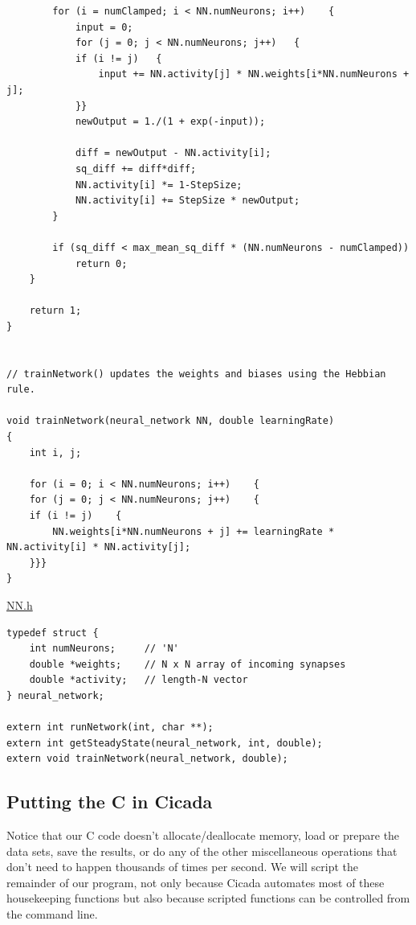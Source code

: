 \documentclass{article}
\newenvironment{longcode}{
       \begin{list}{}{
               \setlength{\leftmargin}{0in}
               \setlength{\rightmargin}{0in}
               \setlength{\topsep}{.2in}
       }
       \small
       \item[] }
       { \end{list}   }
\begin{document}
\begin{longcode}
\begin{verbatim}
        for (i = numClamped; i < NN.numNeurons; i++)	{
            input = 0;
            for (j = 0; j < NN.numNeurons; j++)   {
            if (i != j)   {
                input += NN.activity[j] * NN.weights[i*NN.numNeurons + j];
            }}
            newOutput = 1./(1 + exp(-input));
            
            diff = newOutput - NN.activity[i];
            sq_diff += diff*diff;
            NN.activity[i] *= 1-StepSize;
            NN.activity[i] += StepSize * newOutput;
        }
        
        if (sq_diff < max_mean_sq_diff * (NN.numNeurons - numClamped))
            return 0;
    }
    
    return 1;
}


// trainNetwork() updates the weights and biases using the Hebbian rule.

void trainNetwork(neural_network NN, double learningRate)
{
    int i, j;
    
    for (i = 0; i < NN.numNeurons; i++)    {
    for (j = 0; j < NN.numNeurons; j++)    {
    if (i != j)    {
        NN.weights[i*NN.numNeurons + j] += learningRate * NN.activity[i] * NN.activity[j];
    }}}
}
\end{verbatim} \end{longcode}

\noindent \underline{NN.h}

\begin{longcode} \begin{verbatim}
typedef struct {
    int numNeurons;     // 'N'
    double *weights;    // N x N array of incoming synapses
    double *activity;   // length-N vector
} neural_network;

extern int runNetwork(int, char **);
extern int getSteadyState(neural_network, int, double);
extern void trainNetwork(neural_network, double);
\end{verbatim} \end{longcode}




\subsection{Putting the C in Cicada}

Notice that our C code doesn't allocate/deallocate memory, load or prepare the data sets, save the results, or do any of the other miscellaneous operations that don't need to happen thousands of times per second.  We will script the remainder of our program, not only because Cicada automates most of these housekeeping functions but also because scripted functions can be controlled from the command line.
\end{document}
